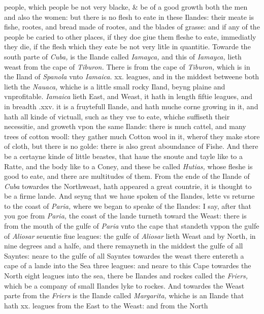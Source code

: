 \documentclass[11pt,twoside]{article}\makeatletter
\begin{document}
	\normalmarginpar
       people, which people be not very blacke, \& be of a good growth both the men and also the women: but there is no flesh to eate in these Ilandes: their meate is fishe, rootes, and bread made of rootes, and the blades of grasse: and if any of the people be caried to other places, if they doe giue them fleshe to eate, im­mediatly they die, if the flesh which they eate be not very litle in quantitie. Towarde the south parte of {\itshape Cuba,} is the Ilande called {\itshape Iamayca,} and this of {\itshape Iamayca,} lieth weast from the cape of {\itshape Tiburon.} There is from the cape of {\itshape Tiburon,} which is in the Iland of {\itshape Spanola} vnto {\itshape Iamaica.} xx. leagues, and in the middest 
	\normalmarginpar
       betweene both lieth the {\itshape Nauaca,} whiche is a little small rocky Iland, beyng plaine and vnprofitable. {\itshape Iamaica} lieth East, and Weast, it hath in length fiftie leagues, and in breadth .xxv. it is a fruytefull Ilande, and hath muche corne growing in it, and hath all kinde of victuall, such as they vse to eate, whiche suffiseth their necessitie, and groweth vpon the same Ilande: there is much cattel, and many trees of cotton wooll: they ga­ther much Cotton wool in it, wherof they make store of cloth, but there is no golde: there is also great aboundance of Fishe. And there be a certayne kinde of little beastes, that haue the snoute and tayle like to a Ratte, and the body like to a Coney, and these be called {\itshape Hutias,} whose fleshe is good to eate, and there are multitudes of them. From the ende of the Ilande of {\itshape Cuba} towardes the Northweast, hath appeared a great coun­trie, it is thought to be a firme lande. And seyng that we haue spoken of the Ilandes, lette vs returne to the coast of {\itshape Paria,} 
	\normalmarginpar
       where we began to speake of the Ilandes: I say, after that you goe from {\itshape Paria,} the coast of the lande turneth toward the Weast: there is from the mouth of the gulfe of {\itshape Paria} vnto the cape that standeth vppon the gulfe of {\itshape Aliosar} seuentie fiue leagues: the gulfe of {\itshape Aliosar} lieth Weast and by North, in %
 nine degrees and a halfe, and there remayneth in the middest the gulfe of all Sayntes: neare to the gulfe of all Sayntes towardes the weast there entereth a cape of a lande into the Sea three leagues: and neare to this Cape towardes the North eight leagues into the sea, there be Ilandes and rockes called the {\itshape Friers,} which be a company of small Ilandes lyke to rockes. And towardes the Weast parte from the {\itshape Friers} is the Ilande called {\itshape Margarita,} whiche is an Ilande that hath xx. leagues from the East to the Weast: and from the North 
\end{document}
